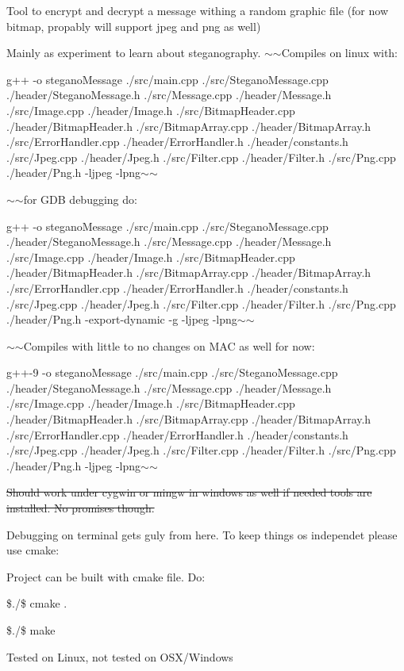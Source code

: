 Tool to encrypt and decrypt a message withing a random graphic file (for now bitmap, propably will support jpeg and png as well)

Mainly as experiment to learn about steganography. $\sim$$\sim$\+Compiles on linux with\+:

g++ -\/o stegano\+Message ./src/main.cpp ./src/\+Stegano\+Message.cpp ./header/\+Stegano\+Message.h ./src/\+Message.cpp ./header/\+Message.h ./src/\+Image.cpp ./header/\+Image.h ./src/\+Bitmap\+Header.cpp ./header/\+Bitmap\+Header.h ./src/\+Bitmap\+Array.cpp ./header/\+Bitmap\+Array.h ./src/\+Error\+Handler.cpp ./header/\+Error\+Handler.h ./header/constants.h ./src/\+Jpeg.cpp ./header/\+Jpeg.h ./src/\+Filter.cpp ./header/\+Filter.h ./src/\+Png.cpp ./header/\+Png.h -\/ljpeg -\/lpng$\sim$$\sim$

$\sim$$\sim$for G\+DB debugging do\+:

g++ -\/o stegano\+Message ./src/main.cpp ./src/\+Stegano\+Message.cpp ./header/\+Stegano\+Message.h ./src/\+Message.cpp ./header/\+Message.h ./src/\+Image.cpp ./header/\+Image.h ./src/\+Bitmap\+Header.cpp ./header/\+Bitmap\+Header.h ./src/\+Bitmap\+Array.cpp ./header/\+Bitmap\+Array.h ./src/\+Error\+Handler.cpp ./header/\+Error\+Handler.h ./header/constants.h ./src/\+Jpeg.cpp ./header/\+Jpeg.h ./src/\+Filter.cpp ./header/\+Filter.h ./src/\+Png.cpp ./header/\+Png.h -\/export-\/dynamic -\/g -\/ljpeg -\/lpng$\sim$$\sim$

$\sim$$\sim$\+Compiles with little to no changes on M\+AC as well for now\+:

g++-\/9 -\/o stegano\+Message ./src/main.cpp ./src/\+Stegano\+Message.cpp ./header/\+Stegano\+Message.h ./src/\+Message.cpp ./header/\+Message.h ./src/\+Image.cpp ./header/\+Image.h ./src/\+Bitmap\+Header.cpp ./header/\+Bitmap\+Header.h ./src/\+Bitmap\+Array.cpp ./header/\+Bitmap\+Array.h ./src/\+Error\+Handler.cpp ./header/\+Error\+Handler.h ./header/constants.h ./src/\+Jpeg.cpp ./header/\+Jpeg.h ./src/\+Filter.cpp ./header/\+Filter.h ./src/\+Png.cpp ./header/\+Png.h -\/ljpeg -\/lpng$\sim$$\sim$

\sout{Should work under cygwin or mingw in windows as well if needed tools are installed. No promises though.}

Debugging on terminal gets guly from here. To keep things os independet please use cmake\+:

Project can be built with cmake file. Do\+:

\$./\$ cmake .

\$./\$ make

Tested on Linux, not tested on O\+S\+X/\+Windows 